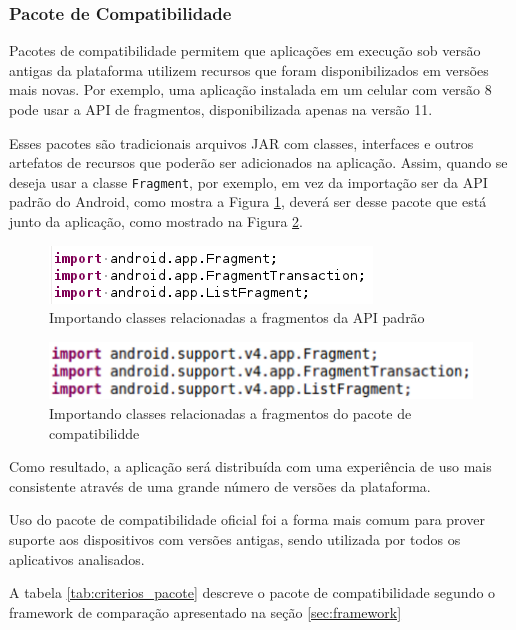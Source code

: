 \subsubsection{Pacote de Compatibilidade}
Pacotes de compatibilidade permitem que aplicações em execução sob versão antigas
da plataforma utilizem recursos que foram disponibilizados em versões mais novas.
Por exemplo, uma aplicação instalada em um celular com versão 8 pode usar a API
de fragmentos, disponibilizada apenas na versão 11.

Esses pacotes são tradicionais arquivos JAR com classes, interfaces e outros
artefatos de recursos que poderão ser adicionados na aplicação. Assim, quando se
deseja usar a classe \texttt{Fragment}, por exemplo, em vez da importação ser da API padrão
do Android, como mostra a Figura \ref{fig:import_fragment_API}, deverá ser desse pacote que
está junto da aplicação, como mostrado na Figura \ref{fig:import_fragment_compat}.

\begin{figure}[ht]
\centering
\includegraphics{imagens/import_fragment_api.png}
\caption{ Importando classes relacionadas a fragmentos da API padrão}
\label{fig:import_fragment_API}
\end{figure}

\begin{figure}[ht]
\centering
\includegraphics{imagens/import_fragment_compat.png}
\caption{Importando classes relacionadas a fragmentos do pacote de compatibilidde}
\label{fig:import_fragment_compat}
\end{figure}

Como resultado, a aplicação será distribuída com uma experiência de uso mais
consistente através de uma grande número de versões da plataforma.

Uso do pacote de compatibilidade oficial foi a forma mais comum para prover
suporte aos dispositivos com versões antigas, sendo utilizada por todos os
aplicativos analisados.

A tabela \ref{tab:criterios_pacote} descreve o pacote de compatibilidade
segundo o framework de comparação apresentado na seção \ref{sec:framework}

